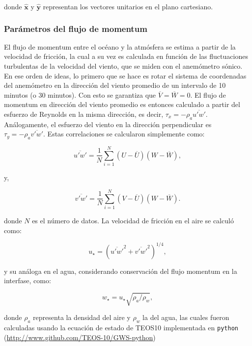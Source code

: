 \documentclass[11pt]{article}
\begin{document}
donde $\mathbf{\hat{x}}$ y $\mathbf{\hat{y}}$ representan los vectores unitarios
en el plano cartesiano.


\subsubsection*{Parámetros del flujo de momentum}%
\label{ssub:parametros_del_flujo_de_momentum}

El flujo de momentum entre el océano y la atmósfera se estima a partir de la
velocidad de fricción, la cual a su vez es calculada en función de las
fluctuaciones turbulentas de la velocidad del viento, que se miden con el
anemómetro sónico. En ese orden de ideas, lo primero que se hace es rotar el
sistema de coordenadas del anemómetro en la dirección del viento promedio de un
intervalo de 10 minutos (o 30 minutos). Con esto se garantiza que
$\overline{V}=\overline{W}=0$. El flujo de momentum en dirección del viento
promedio es entonces calculado a partir del esfuerzo de Reynolds en la misma
dirección, es decir, $\tau_x = -\rho_a \overline{u'w'}$. Análogamente, el
esfuerzo del viento en la dirección perpendicular es $\tau_y = -\rho_a
\overline{v'w'}$. Estas correlaciones se calcularon simplemente como:

\begin{equation}
  \overline{u'w'} = \frac{1}{N} \sum_{i=1}^{N} (U-\overline{U})(W-\overline{W}),
\end{equation}

y,

\begin{equation}
  \overline{v'w'} = \frac{1}{N} \sum_{i=1}^{N} (V-\overline{U})(W-\overline{W}).
\end{equation}

donde $N$ es el número de datos. La velocidad de fricción en el aire se calculó
como:

\begin{equation}
  u_\star = \left( \overline{u'w'}^2 + \overline{v'w'}^2 \right)^{1/4},
\end{equation}

y su análoga en el agua, considerando conservación del flujo momentum en la
interfase, como:

\begin{equation}
  w_\star =  u_\star \sqrt{\rho_a / \rho_w},
\end{equation}

donde $\rho_a$ representa la densidad del aire y $\rho_w$ la del agua, las
cuales fueron calculadas usando la ecuación de estado de TEOS10 implementada en
\texttt{python} (\url{http://www.github.com/TEOS-10/GWS-python})
\end{document}
